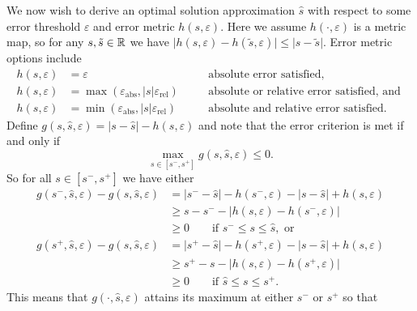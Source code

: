 \documentclass{article}[12pt]
\newcommand{\varepsabs}{\varepsilon_\text{abs}}
\newcommand{\varepsrel}{\varepsilon_\text{rel}}
\newcommand{\JRComment}[1]{{\color{violet} Jag: #1}}
\begin{document}
We now wish to derive an optimal solution approximation $\hat{s}$ with respect to some error threshold $\varepsilon$ and  error metric $h(s,\varepsilon)$. Here we assume $h(\cdot,\varepsilon)$ is a metric map, so for any $s,\tilde{s} \in \mathbb{R}$ we have $\lvert h(s,\varepsilon) - h(\tilde{s},\varepsilon) \rvert \leq \lvert s - \tilde{s} \rvert$. Error metric options include
\begin{subequations}
\begin{align}
    h(s,\varepsilon) & = \varepsilon \quad &&\text{absolute error satisfied}, \label{eq:h_abs}\\
    h(s,\varepsilon) &= \max\left(\varepsabs,\lvert s \rvert \varepsrel \right) \quad &&\text{absolute or relative error satisfied, and } \label{eq:h_abs_or_rel} \\
    h(s,\varepsilon) &= \min\left(\varepsabs,\lvert s \rvert \varepsrel \right) \quad &&\text{absolute and relative error satisfied.} \label{eq:h_abs_and_rel}
\end{align}
\end{subequations}
Define $g(s,\hat{s},\varepsilon)=\lvert s - \hat{s} \rvert -h(s,\varepsilon)$ and note that the error criterion is met if and only if 
\begin{equation*}
    \max_{s \in [s^-,s^+]} g(s,\hat{s},\varepsilon) \leq 0.
\end{equation*}
So for all $s \in [s^-,s^+]$ we have either
\begin{align*}
    g(s^-,\hat{s},\varepsilon)-g(s,\hat{s},\varepsilon) 
    &= \lvert s^- - \hat{s} \rvert -h(s^-,\varepsilon) - \lvert s - \hat{s} \rvert  + h(s,\varepsilon) \\
    &\geq s - s^- - \lvert h(s,\varepsilon)-h(s^-,\varepsilon) \rvert  %
    \\
    &\geq 0 \qquad \text{if } s^- \leq s \leq \hat{s}, \text{ or} \\
    g(s^+,\hat{s},\varepsilon)-g(s,\hat{s},\varepsilon) 
    &= \lvert s^+ - \hat{s} \rvert -h(s^+,\varepsilon) - \lvert s - \hat{s} \rvert  + h(s,\varepsilon) \\
    &\geq s^+ - s - \lvert h(s,\varepsilon)-h(s^+,\varepsilon) \rvert \\
    &\geq 0 \qquad \text{if } \hat{s} \leq s \leq s^+.
\end{align*}
This means that $g(\cdot,\hat{s},\varepsilon)$ attains its maximum at either $s^-$ or $s^+$ so that
\end{document}
